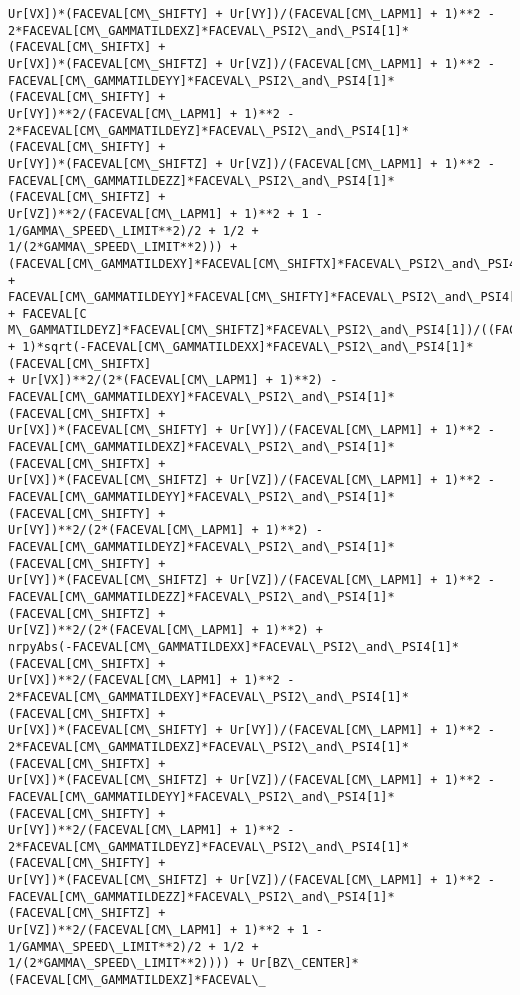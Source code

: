\documentclass[landscape,letterpaper,10pt,english]{article}
\begin{document}
\begin{Verbatim}[commandchars=\\\{\}]
Ur[VX])*(FACEVAL[CM\_SHIFTY] + Ur[VY])/(FACEVAL[CM\_LAPM1] + 1)**2 -
2*FACEVAL[CM\_GAMMATILDEXZ]*FACEVAL\_PSI2\_and\_PSI4[1]*(FACEVAL[CM\_SHIFTX] +
Ur[VX])*(FACEVAL[CM\_SHIFTZ] + Ur[VZ])/(FACEVAL[CM\_LAPM1] + 1)**2 -
FACEVAL[CM\_GAMMATILDEYY]*FACEVAL\_PSI2\_and\_PSI4[1]*(FACEVAL[CM\_SHIFTY] +
Ur[VY])**2/(FACEVAL[CM\_LAPM1] + 1)**2 -
2*FACEVAL[CM\_GAMMATILDEYZ]*FACEVAL\_PSI2\_and\_PSI4[1]*(FACEVAL[CM\_SHIFTY] +
Ur[VY])*(FACEVAL[CM\_SHIFTZ] + Ur[VZ])/(FACEVAL[CM\_LAPM1] + 1)**2 -
FACEVAL[CM\_GAMMATILDEZZ]*FACEVAL\_PSI2\_and\_PSI4[1]*(FACEVAL[CM\_SHIFTZ] +
Ur[VZ])**2/(FACEVAL[CM\_LAPM1] + 1)**2 + 1 - 1/GAMMA\_SPEED\_LIMIT**2)/2 + 1/2 +
1/(2*GAMMA\_SPEED\_LIMIT**2))) +
(FACEVAL[CM\_GAMMATILDEXY]*FACEVAL[CM\_SHIFTX]*FACEVAL\_PSI2\_and\_PSI4[1] +
FACEVAL[CM\_GAMMATILDEYY]*FACEVAL[CM\_SHIFTY]*FACEVAL\_PSI2\_and\_PSI4[1] + FACEVAL[C
M\_GAMMATILDEYZ]*FACEVAL[CM\_SHIFTZ]*FACEVAL\_PSI2\_and\_PSI4[1])/((FACEVAL[CM\_LAPM1]
+ 1)*sqrt(-FACEVAL[CM\_GAMMATILDEXX]*FACEVAL\_PSI2\_and\_PSI4[1]*(FACEVAL[CM\_SHIFTX]
+ Ur[VX])**2/(2*(FACEVAL[CM\_LAPM1] + 1)**2) -
FACEVAL[CM\_GAMMATILDEXY]*FACEVAL\_PSI2\_and\_PSI4[1]*(FACEVAL[CM\_SHIFTX] +
Ur[VX])*(FACEVAL[CM\_SHIFTY] + Ur[VY])/(FACEVAL[CM\_LAPM1] + 1)**2 -
FACEVAL[CM\_GAMMATILDEXZ]*FACEVAL\_PSI2\_and\_PSI4[1]*(FACEVAL[CM\_SHIFTX] +
Ur[VX])*(FACEVAL[CM\_SHIFTZ] + Ur[VZ])/(FACEVAL[CM\_LAPM1] + 1)**2 -
FACEVAL[CM\_GAMMATILDEYY]*FACEVAL\_PSI2\_and\_PSI4[1]*(FACEVAL[CM\_SHIFTY] +
Ur[VY])**2/(2*(FACEVAL[CM\_LAPM1] + 1)**2) -
FACEVAL[CM\_GAMMATILDEYZ]*FACEVAL\_PSI2\_and\_PSI4[1]*(FACEVAL[CM\_SHIFTY] +
Ur[VY])*(FACEVAL[CM\_SHIFTZ] + Ur[VZ])/(FACEVAL[CM\_LAPM1] + 1)**2 -
FACEVAL[CM\_GAMMATILDEZZ]*FACEVAL\_PSI2\_and\_PSI4[1]*(FACEVAL[CM\_SHIFTZ] +
Ur[VZ])**2/(2*(FACEVAL[CM\_LAPM1] + 1)**2) +
nrpyAbs(-FACEVAL[CM\_GAMMATILDEXX]*FACEVAL\_PSI2\_and\_PSI4[1]*(FACEVAL[CM\_SHIFTX] +
Ur[VX])**2/(FACEVAL[CM\_LAPM1] + 1)**2 -
2*FACEVAL[CM\_GAMMATILDEXY]*FACEVAL\_PSI2\_and\_PSI4[1]*(FACEVAL[CM\_SHIFTX] +
Ur[VX])*(FACEVAL[CM\_SHIFTY] + Ur[VY])/(FACEVAL[CM\_LAPM1] + 1)**2 -
2*FACEVAL[CM\_GAMMATILDEXZ]*FACEVAL\_PSI2\_and\_PSI4[1]*(FACEVAL[CM\_SHIFTX] +
Ur[VX])*(FACEVAL[CM\_SHIFTZ] + Ur[VZ])/(FACEVAL[CM\_LAPM1] + 1)**2 -
FACEVAL[CM\_GAMMATILDEYY]*FACEVAL\_PSI2\_and\_PSI4[1]*(FACEVAL[CM\_SHIFTY] +
Ur[VY])**2/(FACEVAL[CM\_LAPM1] + 1)**2 -
2*FACEVAL[CM\_GAMMATILDEYZ]*FACEVAL\_PSI2\_and\_PSI4[1]*(FACEVAL[CM\_SHIFTY] +
Ur[VY])*(FACEVAL[CM\_SHIFTZ] + Ur[VZ])/(FACEVAL[CM\_LAPM1] + 1)**2 -
FACEVAL[CM\_GAMMATILDEZZ]*FACEVAL\_PSI2\_and\_PSI4[1]*(FACEVAL[CM\_SHIFTZ] +
Ur[VZ])**2/(FACEVAL[CM\_LAPM1] + 1)**2 + 1 - 1/GAMMA\_SPEED\_LIMIT**2)/2 + 1/2 +
1/(2*GAMMA\_SPEED\_LIMIT**2)))) + Ur[BZ\_CENTER]*(FACEVAL[CM\_GAMMATILDEXZ]*FACEVAL\_

\end{Verbatim}
\end{document}

